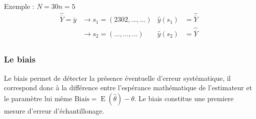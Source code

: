 \documentclass[a4paper]{article}
\DeclareMathOperator{\E}{E}
\begin{document}
Exemple : 
$N=30 n=5$ \\ 
\begin{align*}
    \hat{\overline{Y}} = \overline{y} &\rightarrow s_1 = (2302, \ldots , \ldots ) &\hat{y}(s_1) &= \hat{\overline{Y}} \\
                                      &\rightarrow s_2 = (\ldots, \ldots , \ldots ) &\hat{y}(s_2) &= \hat{\overline{Y}} \\
\end{align*}

\subsubsection{Le biais}
Le biais permet de détecter la présence éventuelle d'erreur systématique, il correspond donc à la différence entre l'espérance mathématique de
l'estimateur  et le paramètre lui même $\text{Biais} = \E(\hat{\theta}) - \theta $. Le biais constitue une premiere mesure d'erreur d'échantillonage.
\end{document}
